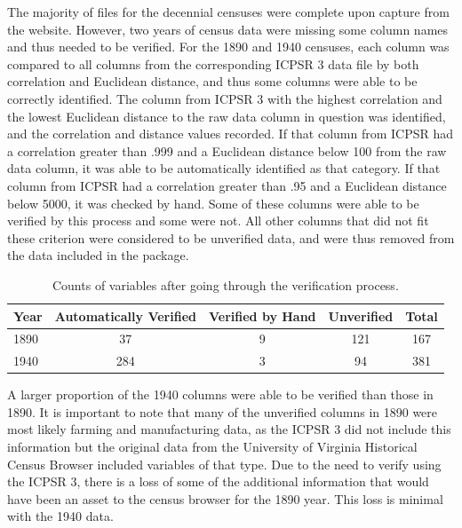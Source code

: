 \documentclass[11pt,]{article}
\begin{document}
The majority of files for the decennial censuses were complete upon
capture from the website. However, two years of census data were missing
some column names and thus needed to be verified. For the 1890 and 1940
censuses, each column was compared to all columns from the corresponding
ICPSR 3 data file by both correlation and Euclidean distance, and thus
some columns were able to be correctly identified. The column from ICPSR
3 with the highest correlation and the lowest Euclidean distance to the
raw data column in question was identified, and the correlation and
distance values recorded. If that column from ICPSR had a correlation
greater than .999 and a Euclidean distance below 100 from the raw data
column, it was able to be automatically identified as that category. If
that column from ICPSR had a correlation greater than .95 and a
Euclidean distance below 5000, it was checked by hand. Some of these
columns were able to be verified by this process and some were not. All
other columns that did not fit these criterion were considered to be
unverified data, and were thus removed from the data included in the
package.

\begin{table}[H]
\centering

  \begin{tabular}{l|c|c|c|c}
  \hline
  Year & Automatically Verified & Verified by Hand & Unverified & Total \\ \hline
  1890 & 37 & 9 & 121 & 167 \\ 
  1940 & 284 & 3 & 94 & 381 \\ 
  \end{tabular}

  \caption{Counts of variables after going through the verification process.}
  \label{verify-table}
\end{table}

A larger proportion of the 1940 columns were able to be verified than
those in 1890. It is important to note that many of the unverified
columns in 1890 were most likely farming and manufacturing data, as the
ICPSR 3 did not include this information but the original data from the
University of Virginia Historical Census Browser included variables of
that type. Due to the need to verify using the ICPSR 3, there is a loss
of some of the additional information that would have been an asset to
the census browser for the 1890 year. This loss is minimal with the 1940
data.
\end{document}
